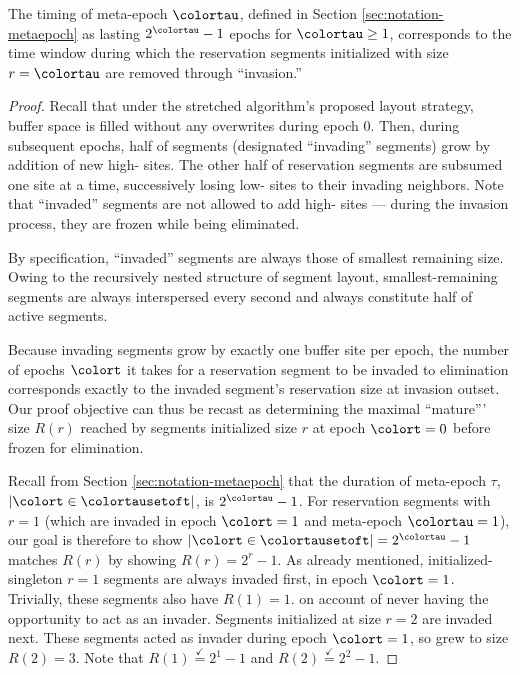 \begin{lemma}
\label{thm:stretched-meta-epoch}

The timing of meta-epoch $\colortau$, defined in Section \ref{sec:notation-metaepoch} as lasting $2^{\colortau} - 1$ epochs for $\colortau\geq1$, corresponds to the time window during which the reservation segments initialized with size $r=\colortau$ are removed through ``invasion.''
\end{lemma}

\begin{proof}

Recall that under the stretched algorithm's proposed layout strategy, buffer space is filled without any overwrites during epoch 0.
Then, during subsequent epochs, half of segments (designated ``invading'' segments) grow by addition of new high-\hv{} sites.
The other half of reservation segments are subsumed one site at a time, successively losing low-\hv{} sites to their invading neighbors.
Note that ``invaded'' segments are not allowed to add high-\hv{} sites --- during the invasion process, they are frozen while being eliminated.

By specification, ``invaded'' segments are always those of smallest remaining size.
Owing to the recursively nested structure of segment layout, smallest-remaining segments are always interspersed every second and always constitute half of active segments.

Because invading segments grow by exactly one buffer site per epoch, the number of epochs $\colort$ it takes for a reservation segment to be invaded to elimination corresponds exactly to the invaded segment's reservation size at invasion outset.
Our proof objective can thus be recast as determining the maximal ``mature''' size $R(r)$ reached by segments initialized size $r$ at epoch $\colort=0$ before frozen for elimination.

Recall from Section \ref{sec:notation-metaepoch} that the duration of meta-epoch $\tau$, $|\colort \in \colortausetoft|$, is $2^{\colortau} - 1$.
For reservation segments with $r=1$ (which are invaded in epoch $\colort=1$ and meta-epoch $\colortau = 1$), our goal is therefore to show $|\colort \in \colortausetoft| = 2^{\colortau} - 1$ matches $R(r)$ by showing $R(r) = 2^{r} - 1$.
As already mentioned, initialized-singleton $r=1$ segments are always invaded first, in epoch $\colort=1$.
Trivially, these segments also have $R(1) = 1$. on account of never having the opportunity to act as an invader.
Segments initialized at size $r=2$ are invaded next.
These segments acted as invader during epoch $\colort=1$, so grew to size $R(2) = 3$.
Note that $R(1) \stackrel{\checkmark}{=} 2^1 - 1$ and $R(2) \stackrel{\checkmark}{=} 2^2 - 1$.


\end{proof}
